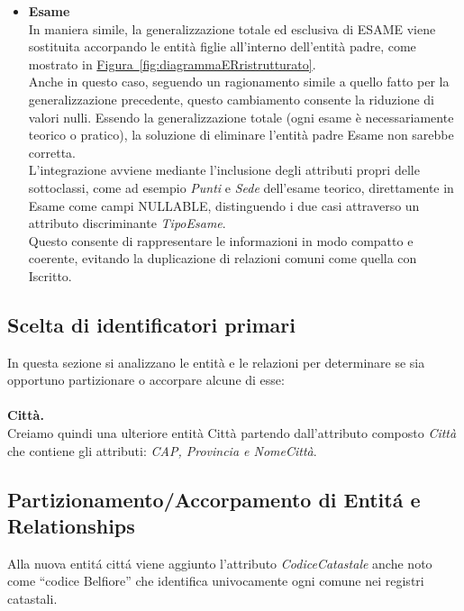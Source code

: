\documentclass[10pt,twoside]{article}
\begin{document}
{{\begin{itemize}
            spostando in esse gli attributi specifici, ma ciò avrebbe comportato la duplicazione 
            delle relazioni comuni come Prenotazione e Recensione verso entrambe
            le sottoclassi.
            \item \textbf{Esame} \\In maniera simile, la generalizzazione totale ed esclusiva di ESAME viene sostituita 
            accorpando le entità figlie all’interno dell'entità padre, come mostrato in \hyperref[fig:diagrammaERristrutturato]{Figura~\ref*{fig:diagrammaERristrutturato}}. \\ 
            Anche in questo caso, seguendo un ragionamento simile a quello fatto per la 
            generalizzazione precedente, questo cambiamento consente la riduzione di valori nulli.
            Essendo la generalizzazione totale (ogni esame è necessariamente teorico o pratico), 
            la soluzione di eliminare l’entità padre Esame non sarebbe corretta. \\
            L'integrazione avviene mediante l'inclusione degli attributi propri delle sottoclassi,
            come ad esempio \textit{Punti} e \textit{Sede} dell'esame teorico, direttamente in Esame come campi 
            NULLABLE, distinguendo i due casi attraverso un attributo discriminante \textit{TipoEsame}. \\
            Questo consente di rappresentare le informazioni in modo compatto e coerente, 
            evitando la duplicazione di relazioni comuni come quella con Iscritto.
        \end{itemize}
    }

    \subsection{Scelta di identificatori primari}{
        In questa sezione si analizzano le entità e le relazioni per determinare se sia opportuno partizionare o accorpare alcune di esse:\\
        \\ \textbf{Città.} \\ 
        Creiamo quindi una ulteriore entità Città partendo dall'attributo composto \textit{Città} che contiene gli attributi: \textit{CAP, Provincia e NomeCittà}.
    }

    \subsection{Partizionamento/Accorpamento di Entitá e Relationships}{
        Alla nuova entitá cittá viene aggiunto l’attributo \textit{CodiceCatastale} anche noto come “codice
        Belfiore” che identifica univocamente ogni comune nei registri catastali.
    }

}
\end{document}

